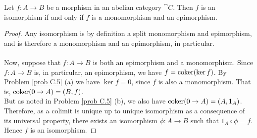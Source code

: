 \vspace*{0.1in}

\begin{lemma}
Let $f:A \to B$ be a morphism in an abelian category $\cat{C}$. Then $f$ is an isomorphism if and only if $f$ is a monomorphism and an epimorphism.
\end{lemma}
\begin{proof}
Any isomorphism is by definition a split monomorphism and epimorphism, and is therefore a monomorphism and an epimorphism, in particular.\\
\\
Now, suppose that $f:A \to B$ is both an epimorphism and a monomorphism. Since $f:A \to B$ is, in particular, an epimorphism, we have $f = \operatorname{coker}(\ker f)$. By Problem \ref{prob C.5} (a) we have $\ker f = 0$, since $f$ is also a monomorphism. That is, $\operatorname{coker}(0 \to A) = (B,f)$.\\[0.5em]%
But as noted in Problem \ref{prob C.5} (b), we also have $\operatorname{coker} (0 \to A) = (A,1_A)$. Therefore, as a colimit is unique up to unique isomorphism as a consequence of its universal property, there exists an isomorphism $\phi:A \to B$ such that $1_A\circ\phi = f$. Hence $f$ is an isomorphism.
\end{proof}

\vspace*{0.1in}

